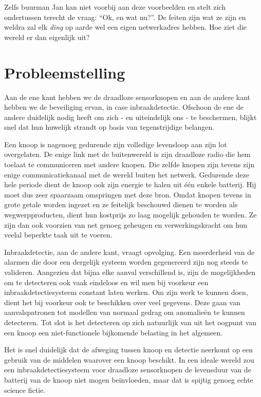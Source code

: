 \documentclass[12pt,a4paper,draft]{article}
\begin{document}
Zelfs buurman Jan kan niet voorbij aan deze voorbeelden en stelt zich
ondertussen terecht de vraag: ``Ok, en wat nu?''. De feiten zijn wat ze zijn en
weldra zal elk \emph{ding} op aarde wel een eigen netwerkadres hebben. Hoe ziet
die wereld er dan eigenlijk uit?

\section*{Probleemstelling}

Aan de ene kant hebben we de draadloze sensorknopen en aan de andere kant
hebben we de beveiliging ervan, in case inbraakdetectie. Ofschoon de ene de
andere duidelijk nodig heeft om zich - en uiteindelijk ons - te beschermen,
blijkt snel dat hun huwelijk strandt op basis van tegenstrijdige belangen.

Een knoop is nagenoeg gedurende zijn volledige levensloop aan zijn lot
overgelaten. De enige link met de buitenwereld is zijn draadloze radio die hem
toelaat te communiceren met andere knopen. Die zelfde knopen zijn tevens zijn
enige communicatiekanaal met de wereld buiten het netwerk. Gedurende deze hele
periode dient de knoop ook zijn energie te halen uit \'e\'en enkele batterij.
Hij moet dus zeer spaarzaam omspringen met deze bron. Omdat knopen tevens in
grote getale worden ingezet en ze feitelijk beschouwd dienen te worden als
wegwerpproducten, dient hun kostprijs zo laag mogelijk gehouden te worden. Ze
zijn dan ook voorzien van net genoeg geheugen en verwerkingskracht om hun
veelal beperkte taak uit te voeren.

Inbraakdetectie, aan de andere kant, vraagt opvolging. Een meerderheid van de
alarmen die door een dergelijk systeem worden gegenereerd zijn nog steeds te
valideren. Aangezien dat bijna elke aanval verschillend is, zijn de
mogelijkheden om te detecteren ook vaak eindeloos en wil men bij voorkeur een
inbraakdetectiesysteem constant laten werken. Om zijn werk te kunnen doen,
dient het bij voorkeur ook te beschikken over veel gegevens. Deze gaan van
aanvalspatronen tot modellen van normaal gedrag om anomalie\"en te kunnen
detecteren. Tot slot is het detecteren op zich natuurlijk van uit het oogpunt
van een knoop een niet-functionele bijkomende belasting in het algemeen.

Het is snel duidelijk dat de afweging tussen knoop en detectie neerkomt op een
gebruik van de middelen waarover een knoop beschikt. In een ideale wereld zou
een inbraakdetectiesysteem voor draadloze sensorknopen de levensduur van de
batterij van de knoop niet mogen be\"invloeden, maar dat is spijtig genoeg
echte science fictie.
\end{document}
